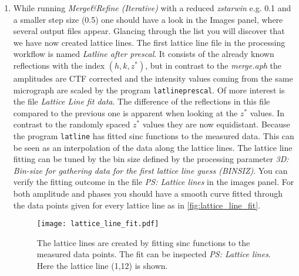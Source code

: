 \begin{enumerate}
	\item While running \textit{Merge\&Refine (Iterative)} with a reduced \textit{zstarwin} e.g. 0.1 and a smaller step size (0.5) one should have a look in the Images panel, where several output files appear. Glancing through the list you will discover that we have now created lattice lines. The first lattice line file in the processing workflow is named \textit{Latline after prescal}. It consists of the already known reflections with the index $(h,k,z^*)$, but in contrast to the  \textit{merge.aph} the amplitudes are CTF corrected and the intensity values coming from the same micrograph are scaled  by the program \texttt{latlineprescal}. Of more interest is the file \textit{Lattice Line fit data}. The difference of the reflections in this file compared to the previous one is apparent when looking at the $z^*$ values. In contrast to the randomly spaced $z^*$ values they are now equidistant. Because the program \texttt{latline} has fitted sinc functions to the measured data.   This can be seen as an interpolation of the data along the lattice lines. The lattice line fitting can be tuned by the bin size defined by the processing parameter \textit{3D: Bin-size for gathering data for the first lattice line guess (BINSIZ)}. You can verify the fitting outcome in the file \textit{PS: Lattice lines} in the images panel. For both amplitude and phases you should have a smooth curve fitted through the data points given for every lattice line as in \autoref{fig:lattice_line_fit}. 
	
		\begin{figure}[H]
		\centering
		\texttt{[image: lattice\_line\_fit.pdf]}
		\caption{The lattice lines are created by fitting sinc functions to the measured data points. The fit can be inspected \textit{PS: Lattice lines}. Here the lattice line (1,12) is shown.}
		\label{fig:lattice_line_fit}
	\end{figure}
	

\end{enumerate}

